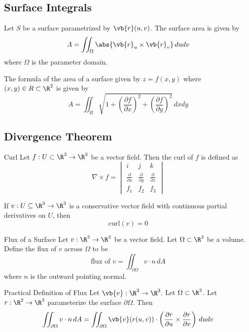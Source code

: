 \documentclass[a4paper]{article}
\begin{document}
\subsection{Surface Integrals}
\begin{thm}{}{} Let $S$ be a surface parametrized by $\vb{r}(u,v)$. The surface area is given by $$A=\iint_{\Omega}\abs{\vb{r}_u\times\vb{r}_v}\,dudv$$ where $\Omega$ is the parameter domain. 
\end{thm}

\begin{lmm}{}{} The formula of the area of a surface given by $z=f(x,y)$ where $(x,y)\in R\subset\R^2$ is given by $$A=\iint_{R}\sqrt{1+\left(\frac{\partial f}{\partial x}\right)^2+\left(\frac{\partial f}{\partial y}\right)^2}\,dxdy$$
\end{lmm}

\subsection{Divergence Theorem}
\begin{defn}{Curl}{} Let $f:U\subset\R^3\to\R^3$ be a vector field. Then the curl of $f$ is defined as $$\nabla\times f=\begin{vmatrix}
i&j&k\\
\frac{\partial}{\partial x}&\frac{\partial}{\partial y}&\frac{\partial}{\partial z}\\
f_1&f_2&f_3
\end{vmatrix}$$
\end{defn}

\begin{prp}{}{} If $v:U\subseteq\R^3\to\R^3$ is a conservative vector field with continuous partial derivatives on $U$, then $$\text{curl}(v)=0$$
\end{prp}

\begin{defn}{Flux of a Surface}{} Let $v:\R^3\to\R^3$ be a vector field. Let $\Omega\subset\R^3$ be a volume. Define the flux of $v$ across $\Omega$ to be $$\text{flux of }v=\iint_{\partial\Omega}v\cdot n\,dA$$ where $n$ is the outward pointing normal. 
\end{defn}

\begin{lmm}{Practical Definition of Flux}{} Let $\vb{v}:\R^3\to\R^3$. Let $\Omega\subset\R^3$. Let $r:\R^2\to\R^3$ parameterize the surface $\partial\Omega$. Then $$\iint_{\partial\Omega}v\cdot n\,dA=\iint_{\partial\Omega}\vb{v}(r(u,v))\cdot\left(\frac{\partial r}{\partial u}\times\frac{\partial r}{\partial v}\right)\,dudv$$
\end{lmm}
\end{document}
